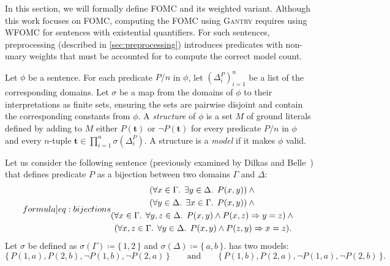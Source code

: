 \documentclass[a4paper,UKenglish,cleveref,autoref,thm-restate]{lipics-v2021}
\newcommand{\Cranetwo}{\textsc{Gantry}}
\begin{document}
In this section, we will formally define FOMC and its weighted variant. Although
this work focuses on FOMC, computing the FOMC using \Cranetwo{} requires using
WFOMC for sentences with existential quantifiers. For such sentences,
preprocessing (described in \cref{sec:preprocessing}) introduces predicates with
non-unary weights that must be accounted for to compute the correct model count.

\begin{definition}\label{def:model}
  Let $\phi$ be a sentence. For each predicate $P/n$ in $\phi$, let
  ${(\Delta_{i}^{P})}_{i=1}^{n}$ be a list of the corresponding domains. Let
  $\sigma$ be a map from the domains of $\phi$ to their interpretations as
  finite sets, ensuring the sets are pairwise disjoint and contain the
  corresponding constants from $\phi$. A \emph{structure} of $\phi$ is a set $M$
  of ground literals defined by adding to $M$ either $P(\mathbf{t})$ or
  $\neg P(\mathbf{t})$ for every predicate $P/n$ in $\phi$ and every $n$-tuple
  $\mathbf{t} \in \prod_{i=1}^{n} \sigma(\Delta_{i}^{P})$. A structure is a
  \emph{model} if it makes $\phi$ valid.
\end{definition}

\begin{example}\label{example:bijections}
  Let us consider the following sentence (previously examined by Dilkas and
  Belle~\cite{DBLP:conf/kr/DilkasB23}) that defines predicate $P$ as a bijection
  between two domains $\Gamma$ and $\Delta$:
  \begin{equation}\label[formula]{eq:bijections}
    \begin{gathered}
      (\forall x \in \Gamma\text{. }\exists y \in \Delta\text{. }P(x, y))\land{}\\
      (\forall y \in \Delta\text{. }\exists x \in \Gamma\text{. }P(x, y))\land{}\\
      (\forall x \in \Gamma\text{. }\forall y, z \in \Delta\text{. }P(x, y) \land P(x, z) \Rightarrow y = z)\land{}\\
      (\forall x, z \in \Gamma\text{. }\forall y \in \Delta\text{. }P(x, y) \land P(z, y) \Rightarrow x = z).
    \end{gathered}
  \end{equation}
  Let $\sigma$ be defined as $\sigma(\Gamma) \coloneqq \{\, 1, 2\,\}$ and
  $\sigma(\Delta) \coloneqq \{\,a, b\,\}$.  has two models:
  \[
    \{\, P(1, a), P(2, b), \neg P(1, b), \neg P(2, a) \,\} \qquad \text{and} \qquad \{\, P(1, b), P(2, a), \neg P(1, a), \neg P(2, b) \,\}.
  \]
\end{example}
\end{document}
